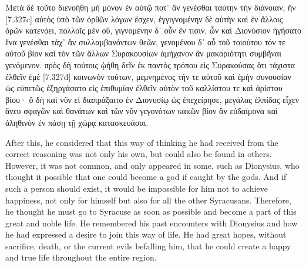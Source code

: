 \documentclass[12pt]{book}
\begin{document}
\Columns
\begin{pairs}
\begin{Rightside}
\begin{Ancient Greek}
\beginnumbering
\pstart
Μετὰ δὲ τοῦτο διενοήθη μὴ μόνον ἐν αὑτῷ ποτ᾽ ἂν γενέσθαι ταύτην τὴν διάνοιαν, ἣν [7.327c] αὐτὸς ὑπὸ τῶν ὀρθῶν λόγων ἔσχεν, ἐγγιγνομένην δὲ αὐτὴν καὶ ἐν ἄλλοις ὁρῶν κατενόει, πολλοῖς μὲν οὔ, γιγνομένην δ᾽ οὖν ἔν τισιν, ὧν καὶ Διονύσιον ἡγήσατο ἕνα γενέσθαι τάχ᾽ ἂν συλλαμβανόντων θεῶν, γενομένου δ᾽ αὖ τοῦ τοιούτου τόν τε αὐτοῦ βίον καὶ τὸν τῶν ἄλλων Συρακουσίων ἀμήχανον ἂν μακαριότητι συμβῆναι γενόμενον. πρὸς δὴ τούτοις ᾠήθη δεῖν ἐκ παντὸς τρόπου εἰς Συρακούσας ὅτι τάχιστα ἐλθεῖν ἐμὲ [7.327d] κοινωνὸν τούτων, μεμνημένος τήν τε αὑτοῦ καὶ ἐμὴν συνουσίαν ὡς εὐπετῶς ἐξηργάσατο εἰς ἐπιθυμίαν ἐλθεῖν αὐτὸν τοῦ καλλίστου τε καὶ ἀρίστου βίου· ὃ δὴ καὶ νῦν εἰ διαπράξαιτο ἐν Διονυσίῳ ὡς ἐπεχείρησε, μεγάλας ἐλπίδας εἶχεν ἄνευ σφαγῶν καὶ θανάτων καὶ τῶν νῦν γεγονότων κακῶν βίον ἂν εὐδαίμονα καὶ ἀληθινὸν ἐν πάσῃ τῇ χώρᾳ κατασκευάσαι.	
\pend
\endnumbering
\end{Ancient Greek}
\end{Rightside}
\begin{Leftside}
\begin{English}
\beginnumbering
\pstart
After this, he considered that this way of thinking he had received from the correct reasoning was not only his own, but could also be found in others. However, it was not common, and only appeared in some, such as Dionysius, who thought it possible that one could become a god if caught by the gods. And if such a person should exist, it would be impossible for him not to achieve happiness, not only for himself but also for all the other Syracusans. Therefore, he thought he must go to Syracuse as soon as possible and become a part of this great and noble life. He remembered his past encounters with Dionysius and how he had expressed a desire to join this way of life. He had great hopes, without sacrifice, death, or the current evils befalling him, that he could create a happy and true life throughout the entire region.
\pend
\endnumbering
\end{English}
\end{Leftside}
\end{pairs}
\Columns
\end{document}
